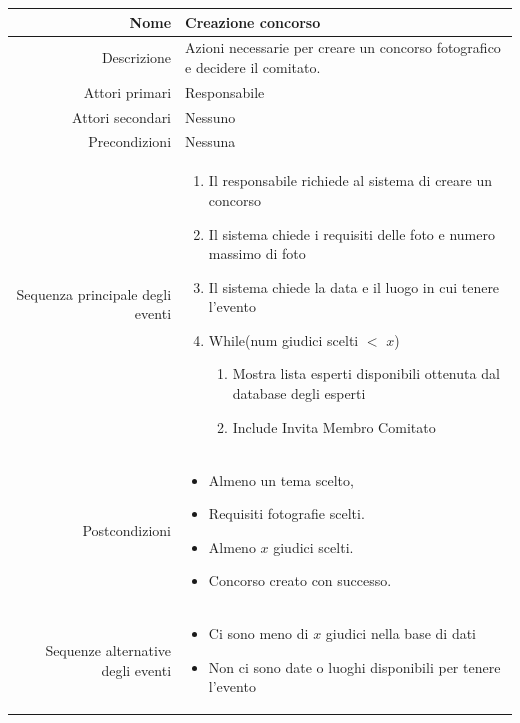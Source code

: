 \documentclass{article}
\begin{document}
\begin{center}
    \begin{tabular}{ |r|p{9cm}| }
        \hline
        Nome                              & Creazione concorso                                                           \\
        \hline
        Descrizione                       & Azioni necessarie per creare un concorso fotografico e decidere il comitato. \\
        \hline
        Attori primari                    & Responsabile                                                                 \\
        \hline
        Attori secondari                  & Nessuno                                                                      \\
        \hline
        Precondizioni                     & Nessuna                                                                      \\
        \hline
        Sequenza principale degli eventi  &
        \begin{enumerate}
            \item Il responsabile richiede al sistema di creare un concorso
            \item Il sistema chiede i requisiti delle foto e numero massimo di foto
            \item Il sistema chiede la data e il luogo in cui tenere l’evento
            \item While(num giudici scelti $<$ $x$)
                  \begin{enumerate}
                      \item Mostra lista esperti disponibili ottenuta dal database degli esperti
                      \item Include Invita Membro Comitato
                  \end{enumerate}
        \end{enumerate}
        \\
        \hline
        Postcondizioni                    &
        \begin{itemize}
            \item Almeno un tema scelto,
            \item Requisiti fotografie scelti.
            \item Almeno $x$ giudici scelti.
            \item Concorso creato con successo.
        \end{itemize}
        \\
        \hline
        Sequenze alternative degli eventi &
        \begin{itemize}
            \item Ci sono meno di $x$ giudici nella base di dati
            \item Non ci sono date o luoghi disponibili per tenere l’evento
        \end{itemize}
        \\
        \hline
    \end{tabular}
\end{center}
\end{document}
